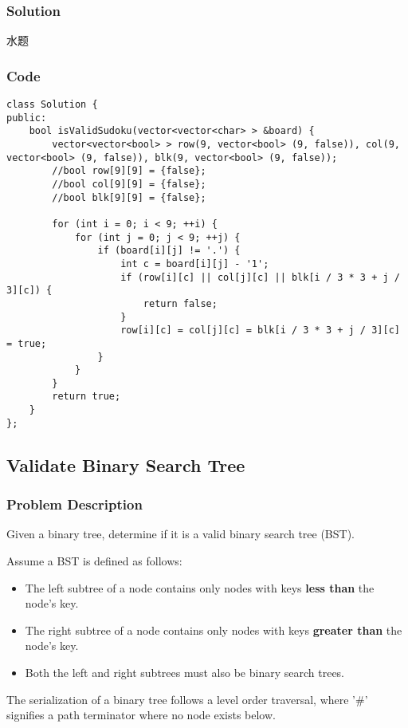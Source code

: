 \documentclass[courier]{article}
\begin{document}
\begin{CJK*}{UTF8}{gkai}
\subsubsection*{Solution}
水题

\subsubsection*{Code}
\begin{lstlisting}
class Solution {
public:
    bool isValidSudoku(vector<vector<char> > &board) {
        vector<vector<bool> > row(9, vector<bool> (9, false)), col(9, vector<bool> (9, false)), blk(9, vector<bool> (9, false));
        //bool row[9][9] = {false};
        //bool col[9][9] = {false};
        //bool blk[9][9] = {false};
        
        for (int i = 0; i < 9; ++i) {
            for (int j = 0; j < 9; ++j) {
                if (board[i][j] != '.') {
                    int c = board[i][j] - '1';
                    if (row[i][c] || col[j][c] || blk[i / 3 * 3 + j / 3][c]) {
                        return false;
                    }
                    row[i][c] = col[j][c] = blk[i / 3 * 3 + j / 3][c] = true;
                }
            }
        }
        return true;
    }
}; 
\end{lstlisting}


\subsection{ Validate Binary Search Tree }

\subsubsection*{Problem Description}
Given a binary tree, determine if it is a valid binary search tree (BST).

Assume a BST is defined as follows:

\begin{itemize}
\item The left subtree of a node contains only nodes with keys \textbf{less than} the node's key.
\item The right subtree of a node contains only nodes with keys \textbf{greater than} the node's key.
\item Both the left and right subtrees must also be binary search trees.
\end{itemize}

The serialization of a binary tree follows a level order traversal, where '\#' signifies a path terminator where no node exists below.


\end{CJK*}
\end{document}
